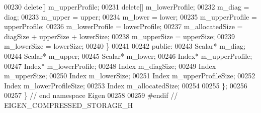 \begin{DoxyCode}
00230         \textcolor{keyword}{delete}[] m\_upperProfile;
00231         \textcolor{keyword}{delete}[] m\_lowerProfile;
00232         m\_diag = diag;
00233         m\_upper = upper;
00234         m\_lower = lower;
00235         m\_upperProfile = upperProfile;
00236         m\_lowerProfile = lowerProfile;
00237         m\_allocatedSize = diagSize + upperSize + lowerSize;
00238         m\_upperSize = upperSize;
00239         m\_lowerSize = lowerSize;
00240     \}
00241 
00242 \textcolor{keyword}{public}:
00243     Scalar* m\_diag;
00244     Scalar* m\_upper;
00245     Scalar* m\_lower;
00246     Index* m\_upperProfile;
00247     Index* m\_lowerProfile;
00248     Index m\_diagSize;
00249     Index m\_upperSize;
00250     Index m\_lowerSize;
00251     Index m\_upperProfileSize;
00252     Index m\_lowerProfileSize;
00253     Index m\_allocatedSize;
00254 
00255 \};
00256 
00257 \} \textcolor{comment}{// end namespace Eigen}
00258 
00259 \textcolor{preprocessor}{#endif // EIGEN\_COMPRESSED\_STORAGE\_H}
\end{DoxyCode}

